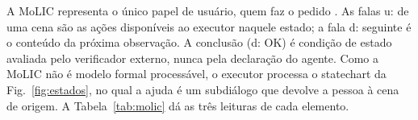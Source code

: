 A MoLIC representa o único papel de usuário, quem faz o pedido \cite{molic}. As falas u: de uma cena são as ações disponíveis ao executor naquele estado; a fala d: seguinte é o conteúdo da próxima observação. A conclusão (d: OK) é condição de estado avaliada pelo verificador externo, nunca pela declaração do agente. Como a MoLIC não é modelo formal processável, o executor processa o statechart da Fig.~\ref{fig:estados}, no qual a ajuda é um subdiálogo que devolve a pessoa à cena de origem. A Tabela~\ref{tab:molic} dá as três leituras de cada elemento.



